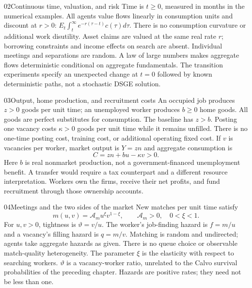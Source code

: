 \begin{modelsetup}[1]
\begin{modelcondition}{02}{Continuous time, valuation, and risk}
Time is $t\geq0$, measured in months in the numerical examples. All agents value
flows linearly in consumption units and discount at $r>0$:
$E_t\int_t^\infty e^{-r(\tau-t)}c(\tau)d\tau$.
There is no consumption curvature or additional work disutility. Asset claims
are valued at the same real rate $r$; borrowing constraints and income effects
on search are absent. Individual meetings and separations are random. A law
of large numbers makes aggregate flows deterministic conditional on aggregate
fundamentals. The transition experiments specify an unexpected change at
$t=0$ followed by known deterministic paths, not a stochastic DSGE solution.
\end{modelcondition}
\end{modelsetup}

\begin{modelsetup}[1]
\begin{modelcondition}{03}{Output, home production, and recruitment costs}
An occupied job produces $z>0$ goods per unit time; an unemployed worker
produces $b\geq0$ home goods. All goods are perfect substitutes for consumption.
The baseline has $z>b$. Posting one vacancy costs $\kappa>0$ goods per unit
time while it remains unfilled. There is no one-time posting cost, training
cost, or additional operating fixed cost. If $v$ is vacancies per worker,
market output is $Y=zn$ and aggregate consumption is
\[
 C=zn+bu-\kappa v>0.
\]
Here $b$ is real nonmarket production, not a government-financed unemployment
benefit. A transfer would require a tax counterpart and a different resource
interpretation. Workers own the firms, receive their net profits, and fund
recruitment through those ownership accounts.
\end{modelcondition}
\end{modelsetup}

\begin{modelsetup}[1]
\begin{modelcondition}{04}{Meetings and the two sides of the market}
New matches per unit time satisfy
\[
 m(u,v)=\mathcal A_m u^\xi v^{1-\xi},\qquad
 \mathcal A_m>0,\quad0<\xi<1.
\]
For $u,v>0$, tightness is $\vartheta=v/u$. The worker's job-finding hazard is
$f=m/u$ and a vacancy's filling hazard is $q=m/v$. Matching is random and
undirected; agents take aggregate hazards as given. There is no queue choice
or observable match-quality heterogeneity. The parameter $\xi$ is the
elasticity with respect to searching workers. $\vartheta$ is a vacancy-worker
ratio, unrelated to the Calvo survival probabilities of the preceding chapter.
Hazards are positive rates; they need not be less than one.
\end{modelcondition}
\end{modelsetup}

